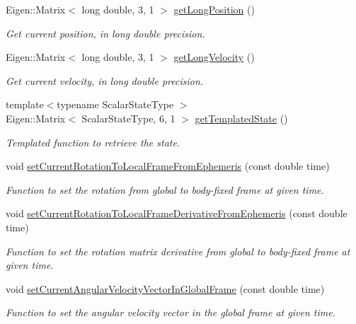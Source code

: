 \begin{DoxyCompactItemize}
Eigen\+::\+Matrix$<$ long double, 3, 1 $>$ \hyperlink{classtudat_1_1simulation__setup_1_1Body_ad60f6964ee99fca9f6a7ea5047a108ff}{get\+Long\+Position} ()
\begin{DoxyCompactList}\small\item\em Get current position, in long double precision. \end{DoxyCompactList}\item 
Eigen\+::\+Matrix$<$ long double, 3, 1 $>$ \hyperlink{classtudat_1_1simulation__setup_1_1Body_aeed3f086d3ca8d4c037bee67ad123016}{get\+Long\+Velocity} ()
\begin{DoxyCompactList}\small\item\em Get current velocity, in long double precision. \end{DoxyCompactList}\item 
{\footnotesize template$<$typename Scalar\+State\+Type $>$ }\\Eigen\+::\+Matrix$<$ Scalar\+State\+Type, 6, 1 $>$ \hyperlink{classtudat_1_1simulation__setup_1_1Body_a11ce61a7598916958edbbaf1e52415ca}{get\+Templated\+State} ()
\begin{DoxyCompactList}\small\item\em Templated function to retrieve the state. \end{DoxyCompactList}\item 
void \hyperlink{classtudat_1_1simulation__setup_1_1Body_a06605a2e4d471743ab9ff19feb6f3431}{set\+Current\+Rotation\+To\+Local\+Frame\+From\+Ephemeris} (const double time)
\begin{DoxyCompactList}\small\item\em Function to set the rotation from global to body-\/fixed frame at given time. \end{DoxyCompactList}\item 
void \hyperlink{classtudat_1_1simulation__setup_1_1Body_a352f45d815d365b742e55e94e0ec8f4c}{set\+Current\+Rotation\+To\+Local\+Frame\+Derivative\+From\+Ephemeris} (const double time)
\begin{DoxyCompactList}\small\item\em Function to set the rotation matrix derivative from global to body-\/fixed frame at given time. \end{DoxyCompactList}\item 
void \hyperlink{classtudat_1_1simulation__setup_1_1Body_a61a6e3eccaed8d438c22003516d8009f}{set\+Current\+Angular\+Velocity\+Vector\+In\+Global\+Frame} (const double time)
\begin{DoxyCompactList}\small\item\em Function to set the angular velocity vector in the global frame at given time. \end{DoxyCompactList}\item 

\end{DoxyCompactItemize}
